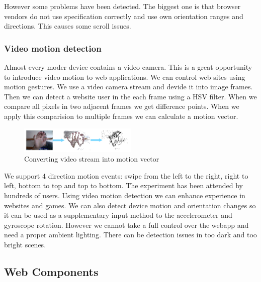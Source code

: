 \documentclass{iitsrc}
\begin{document}
\noindent However some problems have been detected. The biggest one is that browser vendors do not use specification correctly and use own orientation ranges and directions. This causes some scroll issues.


\subsubsection{Video motion detection} %
\label{ssub:video_camera_motion}

Almost every moder device contains a video camera. This is a great opportunity to introduce video motion to web applications. We can control web sites using motion gestures. We use a video camera stream and devide it into image frames. Then we can detect a website user in the each frame using a HSV filter. When we compare all pixels in two adjacent frames we get difference points. When we apply this comparision to multiple frames we can calculate a motion vector.

\begin{figure}[ht]
    \begin{center}
        \includegraphics[width=0.5\textwidth]{../images/videomotion}
        \caption{Converting video stream into motion vector}
        \label{fig:videomotion}
    \end{center}
\end{figure}

\noindent We support 4 direction motion events: swipe from the left to the right, right to left, bottom to top and top to bottom. The experiment has been attended by hundreds of users. Using video motion detection we can enhance experience in websites and games. We can also detect device motion and orientation changes so it can be used as a supplementary input method to the accelerometer and gyroscope rotation. However we cannot take a full control over the webapp and need a proper ambient lighting. There can be detection issues in too dark and too bright scenes.




\subsection{Web Components} %
\label{sub:web_components}
\end{document}
